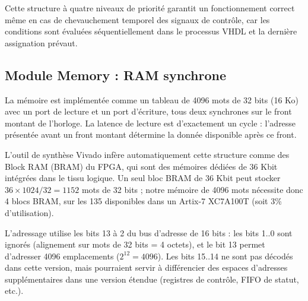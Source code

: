 Cette structure à quatre niveaux de priorité garantit un fonctionnement correct même en cas de chevauchement temporel des signaux de contrôle, car les conditions sont évaluées séquentiellement dans le processus VHDL et la dernière assignation prévaut.

\subsection{Module Memory : RAM synchrone}

La mémoire est implémentée comme un tableau de 4096 mots de 32 bits (16 Ko) avec un port de lecture et un port d'écriture, tous deux synchrones sur le front montant de l'horloge. La latence de lecture est d'exactement un cycle : l'adresse présentée avant un front montant détermine la donnée disponible après ce front.

L'outil de synthèse Vivado infère automatiquement cette structure comme des Block RAM (BRAM) du FPGA, qui sont des mémoires dédiées de 36 Kbit intégrées dans le tissu logique. Un seul bloc BRAM de 36 Kbit peut stocker $36 \times 1024 / 32 = 1152$ mots de 32 bits ; notre mémoire de 4096 mots nécessite donc 4 blocs BRAM, sur les 135 disponibles dans un Artix-7 XC7A100T (soit 3\% d'utilisation).

L'adressage utilise les bits 13 à 2 du bus d'adresse de 16 bits : les bits 1..0 sont ignorés (alignement sur mots de 32 bits = 4 octets), et le bit 13 permet d'adresser 4096 emplacements ($2^{12} = 4096$). Les bits 15..14 ne sont pas décodés dans cette version, mais pourraient servir à différencier des espaces d'adresses supplémentaires dans une version étendue (registres de contrôle, FIFO de statut, etc.).

